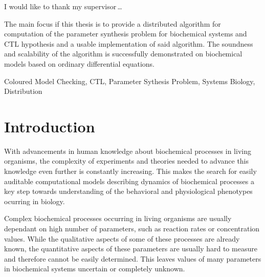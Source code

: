 \documentclass[12pt,oneside, draft]{fithesis2}
\begin{document}
  \FrontMatter                    %
    \ThesisTitlePage                %
    \begin{ThesisDeclaration}       %
      \DeclarationText
      \AdvisorName
    \end{ThesisDeclaration}
    \begin{ThesisThanks}            %
      I would like to thank my supervisor\,\dots
    \end{ThesisThanks}
    \begin{ThesisAbstract}          %
      The main focus if this thesis is to provide a distributed algorithm for computation of the parameter synthesis problem for biochemical systems and CTL hypothesis and a usable implementation of said algorithm. The soundness and scalability of the algorithm is successfully demonstrated on biochemical models based on ordinary differential equations. 
    \end{ThesisAbstract}
    \begin{ThesisKeyWords}          %
		Coloured Model Checking, CTL, Parameter Sythesis Problem, Systems Biology, Distribution
    \end{ThesisKeyWords}
    \tableofcontents                %
  
  \MainMatter                     %
    \chapter{Introduction}          %
	
		With advancements in human knowledge about biochemical processes in living organisms, the complexity of experiments and theories needed to advance this knowledge even further is constantly increasing. This makes the search for easily auditable computational models describing dynamics of biochemical processes a key step towards understanding of the behavioral and physiological phenotypes ocurring in biology.
		
		Complex biochemical processes occurring in living organisms are usually dependant on high number of parameters, such as reaction rates or concentration values. While the qualitative aspects of some of these processes are already known, the quantitative aspects of these parameters are usually hard to measure and therefore cannot be easily determined. This leaves values of many parameters in biochemical systems uncertain or completely unknown.
		
\end{document}
